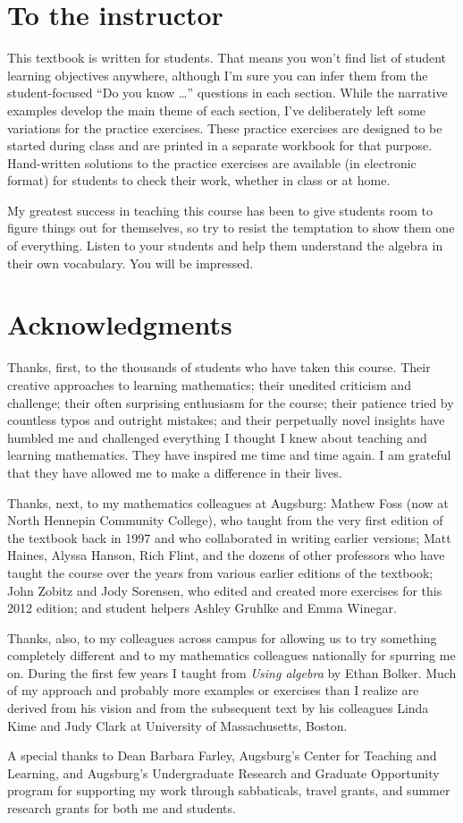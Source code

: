 \section*{To the instructor}
This textbook is written for students.  That means you won't find list of student learning objectives anywhere, although I'm sure you can infer them from the student-focused ``Do you know \ldots'' questions  in each section.  While the narrative examples develop the main theme of each section, I've deliberately left some variations for the practice exercises.   
 These practice exercises are designed to be started during class and are printed in a separate workbook for that purpose.   Hand-written solutions to the practice exercises are available (in electronic format) for students to check their work, whether in class or at home.

My greatest success in teaching this course has been to give students room to figure things out for themselves, so try to resist the temptation to show them one of everything.   Listen to your students and help them understand the algebra in their own vocabulary.  You will be impressed.

\section*{Acknowledgments}

Thanks, first, to the thousands of students who have taken this course.  Their creative approaches to learning mathematics; their unedited criticism and challenge; their often surprising enthusiasm for the course; their patience tried by countless typos and outright mistakes; and their perpetually novel insights have humbled me and challenged everything I thought I knew about teaching and learning mathematics.  They have inspired me time and time again.  I am grateful that they have allowed me to make a difference in their lives.

Thanks, next, to my mathematics colleagues at Augsburg: Mathew Foss (now at North Hennepin Community College), who taught from the very first edition of the textbook back in 1997 and who collaborated in writing earlier versions; Matt Haines, Alyssa Hanson, Rich Flint, and the dozens of other professors who have taught the course over the years from various earlier editions of the textbook; John Zobitz and Jody Sorensen, who edited and created more exercises for this 2012 edition;  and student helpers Ashley Gruhlke and Emma Winegar.

Thanks, also, to my colleagues across campus for allowing us to try something completely different and to my mathematics colleagues nationally for spurring me on.  During the first few years I taught from \emph{Using algebra} by Ethan Bolker.  Much of my approach and probably more examples or exercises than I realize are derived from his vision and from the subsequent text by his colleagues Linda Kime and Judy Clark at University of Massachusetts, Boston.  

A special thanks to Dean Barbara Farley, Augsburg's Center for Teaching and Learning, and Augsburg's Undergraduate Research and Graduate Opportunity program for supporting my work through sabbaticals, travel grants, and summer research grants for both me and students.


